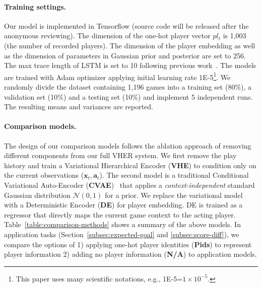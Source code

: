 \documentclass{article}
\newcommand{\action}{\mathbf{a}}
\newcommand{\player}{pl}
\newcommand{\features}{\boldsymbol{x}}
\begin{document}
\paragraph{Training settings.}
Our model is implemented in Tensorflow (source code will be released after the anonymous reviewing). The dimension of the one-hot player vector $\player_{t}$ is 1,003 (the number of recorded players). The dimension of the player embedding as well as the dimension of parameters in Gaussian prior and posterior are set to 256. The max trace length of LSTM is set to 10 following previous work~\cite{Liu2018,littlestone}. The models are trained with Adam optimizer applying initial learning rate 1E-5\footnote{This paper uses many scientific notations, e.g., 1E-5=$1\times10^{-5}$.}.
We randomly divide the dataset containing 1,196 games into a training set (80\%), a validation set (10\%) and a testing set (10\%) and implement 5 independent runs. The resulting means and variances are reported.

\paragraph{Comparison models.}

The design of our comparison models follows the ablation approach of removing different components from our full VHER system. 
We first remove the play history and train a Variational Hierarchical Encoder (\textbf{VHE}) to condition only on the current observations ($\features_{t},\action_{t}$). The second model is  
a traditional Conditional Variational Auto-Encoder (\textbf{CVAE})~\cite{WalkerDGH16} that applies a {\em context-independent} standard Gaussian distribution $\mathcal{N}(0,1)$ for a prior. We replace the variational model with a Deterministic Encoder (\textbf{DE}) \cite{ganguly2018problem} for player embedding. DE is trained as a regressor that directly maps the current game context to the acting player. Table~\ref{table:comparison-methods} shows a summary of the above models.
In application tasks (Section~\ref{subsec:expected-goal} and \ref{subsec:score-diff}),
we compare the options of 1) applying one-hot player identities (\textbf{Pids}) to represent player information 2) adding no player information (\textbf{N/A}) to application models.
\end{document}
